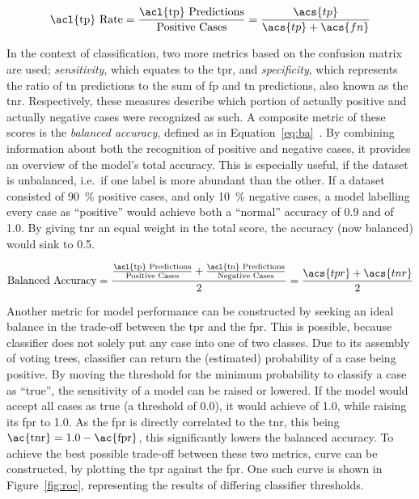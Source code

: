 \begin{equation}
    \text{\acl{tp} Rate} = \frac{\text{\acl{tp} Predictions}}{\text{Positive Cases}} = \frac{\acs{tp}}{\acs{tp} + \acs{fn}}
    \label{eq:true_positive_rate}
\end{equation}

In the context of classification, two more metrics based on the confusion matrix
are used; \textit{sensitivity}, which equates to the \ac{tpr}, and 
\textit{specificity}, which represents the ratio of \ac{tn} predictions to the 
sum of \ac{fp} and \ac{tn} predictions, also known as the \ac{tnr}. Respectively, these measures describe
which portion of actually positive and actually negative cases were recognized 
as such. A composite metric of these scores is the \textit{balanced accuracy}, 
defined as in Equation~\ref{eq:ba}~\cite{evaluating_learning_algorithms,fundamentals_of_machine_learning,balanced_accuracy_and_posterior}.
By combining information about both the recognition of positive and negative 
cases, it provides an overview of the model's total accuracy. This is especially
useful, if the dataset is unbalanced, i.e.~if one label is more abundant than 
the other. If a dataset consisted of \SI{90}{\percent} positive cases, and only
\SI{10}{\percent} negative cases, a model labelling every case as 
\enquote{positive} would achieve both a \enquote{normal} accuracy of 0.9 
and  of 1.0. By giving \ac{tnr} an equal 
weight in the total score, the accuracy (now balanced) would sink to 0.5.

\begin{equation}
    \text{Balanced Accuracy} = \frac{\frac{\text{\acl{tp} Predictions}}{\text{Positive Cases}} + \frac{\text{\acl{tn} Predictions}}{\text{Negative Cases}}}{2} = \frac{\acs{tpr} + \acs{tnr}}{2}
    \label{eq:ba}
\end{equation}

Another metric for model performance can be constructed by seeking an ideal 
balance in the trade-off between the \ac{tpr} and the \ac{fpr}. This is 
possible, because  classifier does not solely put any case into one of two 
classes. Due to its assembly of voting trees,  classifier can return
the (estimated) probability of a case being positive. By moving the threshold
for the minimum probability to classify a case as \enquote{true}, the 
sensitivity of a model can be raised or lowered. If the model would accept all cases as 
true (a threshold of 0.0), it would achieve  of 1.0, while
raising its \ac{fpr} to 1.0. As the \ac{fpr} is directly correlated to the 
\ac{tnr}, this being $\text{\ac{tnr}} = 1.0 - \text{\ac{fpr}}$, this significantly lowers the balanced accuracy. 
To achieve the best possible trade-off between these two metrics,  
curve can be constructed, by plotting the \ac{tpr} against the \ac{fpr}. One such 
curve is shown in Figure~\ref{fig:roc}, representing the results of differing 
classifier thresholds.


